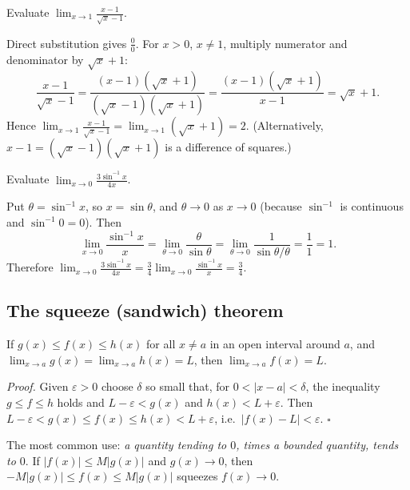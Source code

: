 \begin{example}[DU 12910 Q1(a)(ii)]
Evaluate $\displaystyle\lim_{x\to1}\frac{x-1}{\sqrt x-1}$.
\end{example}
\begin{solution}
Direct substitution gives $\frac00$. For $x>0$, $x\ne1$, multiply numerator and denominator by $\sqrt x+1$:
\[
\frac{x-1}{\sqrt x-1}=\frac{(x-1)(\sqrt x+1)}{(\sqrt x-1)(\sqrt x+1)}=\frac{(x-1)(\sqrt x+1)}{x-1}=\sqrt x+1 .
\]
Hence $\displaystyle\lim_{x\to1}\frac{x-1}{\sqrt x-1}=\lim_{x\to1}(\sqrt x+1)=2$.
(Alternatively, $x-1=(\sqrt x-1)(\sqrt x+1)$ is a difference of squares.)
\end{solution}

\begin{example}[DU 3553 Q1(a)(ii)]
Evaluate $\displaystyle\lim_{x\to0}\frac{3\sin^{-1}x}{4x}$.
\end{example}
\begin{solution}
Put $\theta=\sin^{-1}x$, so $x=\sin\theta$, and $\theta\to0$ as $x\to0$ (because $\sin^{-1}$ is continuous and $\sin^{-1}0=0$). Then
\[
\lim_{x\to0}\frac{\sin^{-1}x}{x}=\lim_{\theta\to0}\frac{\theta}{\sin\theta}=\lim_{\theta\to0}\frac{1}{\sin\theta/\theta}=\frac11=1 .
\]
Therefore $\displaystyle\lim_{x\to0}\frac{3\sin^{-1}x}{4x}=\frac34\lim_{x\to0}\frac{\sin^{-1}x}{x}=\frac34$.
\end{solution}

\subsection{The squeeze (sandwich) theorem}
\begin{theorem}
If $g(x)\le f(x)\le h(x)$ for all $x\ne a$ in an open interval around $a$, and $\lim_{x\to a}g(x)=\lim_{x\to a}h(x)=L$, then $\lim_{x\to a}f(x)=L$.
\end{theorem}
\emph{Proof.} Given $\varepsilon>0$ choose $\delta$ so small that, for $0<|x-a|<\delta$, the inequality $g\le f\le h$ holds and $L-\varepsilon<g(x)$ and $h(x)<L+\varepsilon$. Then $L-\varepsilon<g(x)\le f(x)\le h(x)<L+\varepsilon$, i.e.\ $|f(x)-L|<\varepsilon$. $\square$

The most common use: \emph{a quantity tending to $0$, times a bounded quantity, tends to $0$}. If $|f(x)|\le M|g(x)|$ and $g(x)\to0$, then $-M|g(x)|\le f(x)\le M|g(x)|$ squeezes $f(x)\to0$.

